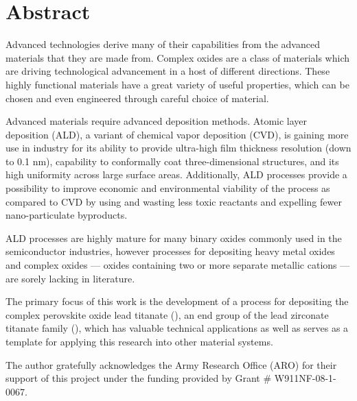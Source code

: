\mbox{}\thispagestyle{empty}
\cleardoublepage
\chapter*{Abstract}


Advanced technologies derive many of their capabilities from the advanced materials that they are made from. Complex oxides are a class of materials which are driving technological advancement in a host of different directions. These highly functional materials have a great variety of useful properties, which can be chosen and even engineered through careful choice of material. 

Advanced materials require advanced deposition methods. Atomic layer deposition (ALD), a variant of chemical vapor deposition (CVD), is gaining more use in industry for its ability to provide ultra-high film thickness resolution (down to 0.1 nm), capability to conformally coat three-dimensional structures, and its high uniformity across large surface areas. Additionally, ALD processes provide a possibility to improve economic and environmental viability of the process as compared to CVD by using and wasting less toxic reactants and expelling fewer nano-particulate byproducts. 

ALD processes are highly mature for many binary oxides commonly used in the semiconductor industries, however processes for depositing heavy metal oxides and complex oxides --- oxides containing two or more separate metallic cations --- are sorely lacking in literature. 

The primary focus of this work is the development of a process for depositing the complex perovskite oxide lead titanate (\PTO{}), an end group of the lead zirconate titanate family (), which has valuable technical applications as well as serves as a template for applying this research into other material systems. 

The author gratefully acknowledges the Army Research Office (ARO) for their support of this project under the funding provided by Grant \# W911NF-08-1-0067.


